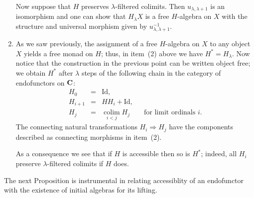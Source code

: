 \documentclass[oribibl,envcountsame,envcountsect,runningheads]{llncs}
\newcommand{\free}[1]{{#1^*}}
\renewcommand{\>}{\rangle}
\def\Id{\mathrm{Id}}
\def\colim{\mathop{\textrm{colim}}}
\def\To{\Rightarrow}
\begin{document}
\begin{remark}
\begin{enumerate}[(1)]
    Now suppose that $H$ preserves $\lambda$-filtered
    colimits. Then $u_{\lambda, \lambda+1}$ is an isomorphism and one
    can show that $H_\lambda X$ is a free $H$-algebra on $X$ with the
    structure and universal morphism given by
    $u_{\lambda,\lambda+1}^{-1}$.
  \item \label{pt:freeHaccessible} As we saw previously, the assignment of a free $H$-algebra on $X$
    to any object $X$ yields a free monad on $H$; thus, in item~(2)
    above we have $\free{H} = H_\lambda$. Now notice that the construction
    in the previous point can be written object free; we obtain $\free{H}$
    after $\lambda$ steps of the following chain in the category of
    endofunctors on $\mathbf{C}$:
    \begin{eqnarray*}
      H_0 & = & \Id, \\
      H_{i+1} & = & HH_i + \Id, \\
      H_j & = & \colim\limits_{i < j} H_j \qquad\textrm{for limit
        ordinals $i$.}
    \end{eqnarray*}
    The connecting natural transformations $H_i \To H_j$ have the
    components described as connecting morphisms in item~(2).

    As a consequence we see that if $H$ is accessible then so is
    $\free{H}$; indeed, all $H_i$  preserve $\lambda$-filtered colimits if
    $H$ does.
  \end{enumerate}
\end{remark}

The next Proposition is instrumental in relating accessiblity of an endofunctor with the existence of initial algebras for its lifting.
\end{document}
